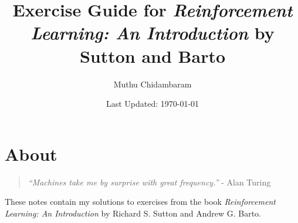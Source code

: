 \documentclass{article}
\begin{document}
\title{Exercise Guide for \textit{Reinforcement Learning: An Introduction} by Sutton and Barto}
\author{Muthu Chidambaram}
\date{Last Updated: \today}

\maketitle

\tableofcontents
\newpage 

\section*{About}

\begin{quote}
        \textit{``Machines take me by surprise with great frequency.''} 
        - Alan Turing
\end{quote}

These notes contain my solutions to exercises from the book \textit{Reinforcement Learning: An Introduction} by
Richard S. Sutton and Andrew G. Barto.


\end{document}
